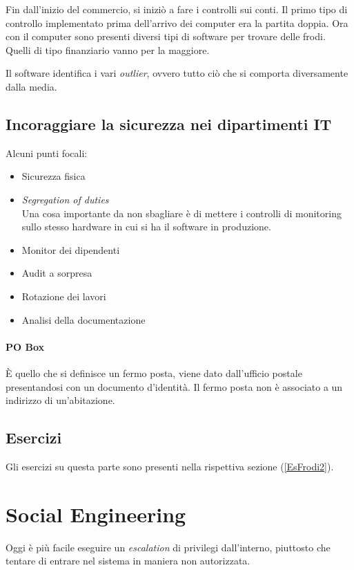 Fin dall'inizio del commercio, si iniziò a fare i controlli sui conti. Il
primo tipo di controllo implementato prima dell'arrivo dei computer era la
partita doppia. Ora con il computer sono presenti diversi tipi di software
per trovare delle frodi. Quelli di tipo finanziario vanno per la maggiore.

Il software identifica i vari \textit{outlier}, ovvero tutto ciò che si
comporta diversamente dalla media.

\subsection{Incoraggiare la sicurezza nei dipartimenti IT}

Alcuni punti focali:
\begin{itemize}
  \item Sicurezza fisica
  \item \textit{Segregation of duties} \\
  Una cosa importante da non sbagliare è di mettere i controlli di monitoring
  sullo stesso hardware in cui si ha il software in produzione.
  \item Monitor dei dipendenti
  \item Audit a sorpresa
  \item Rotazione dei lavori
  \item Analisi della documentazione
\end{itemize}

\paragraph*{PO Box} 

È quello che si definisce un fermo posta, viene dato dall'ufficio postale
presentandosi con un documento d'identità. Il fermo posta non è associato a un
indirizzo di un'abitazione.

\subsection{Esercizi}

Gli esercizi su questa parte sono presenti nella rispettiva sezione
(\ref{EsFrodi2}).

\section{Social Engineering}
		
Oggi è più facile eseguire un \textit{escalation} di privilegi dall'interno,
piuttosto che tentare di entrare nel sistema in maniera non autorizzata.

